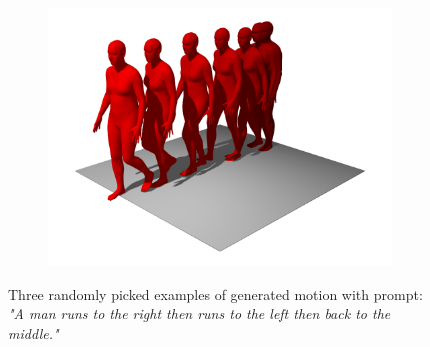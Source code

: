 \begin{figure}
\begin{subfigure}{0.32\linewidth}
        \includegraphics[width=\linewidth]{figures/results/single-runs3.png}
    \end{subfigure}
    \caption{Three randomly picked examples of generated motion with prompt: \textit{"A man runs to the right then runs to the left then back to the middle."}}
\end{figure}


